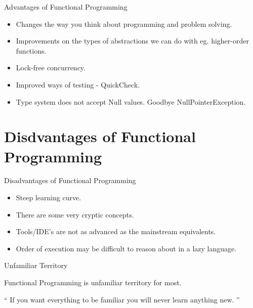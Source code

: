 \documentclass{beamer}
\begin{document}
\begin{frame}{Advantages of Functional Programming}

  \begin{itemize}[<+->]
  \item Changes the way you think about programming and problem solving.
  \item Improvements on the types of abstractions we can do with eg.
    higher-order functions.
  \item Lock-free concurrency.
  \item Improved ways of testing - QuickCheck.
  \item Type system does not accept Null values. Goodbye NullPointerException.
  \end{itemize}

\end{frame}

\section{Disdvantages of Functional Programming}

\begin{frame}{Disadvantages of Functional Programming}

  \begin{itemize}[<+->]
  \item Steep learning curve.
  \item There are some very cryptic concepts.
  \item Tools/IDE's are not as advanced as the mainstream equivalents.
  \item Order of execution may be difficult to reason about in a lazy language.
  \end{itemize}

\end{frame}


\begin{frame}{Unfamiliar Territory}

  {\Large Functional Programming is unfamiliar territory for most.}

\begin{exampleblock}{}
  {\Large ``
    If you want everything to be familiar you will never learn anything new.
  ''}
  \vskip5mm
  \hspace*{}
\end{exampleblock}

\end{frame}
\end{document}
